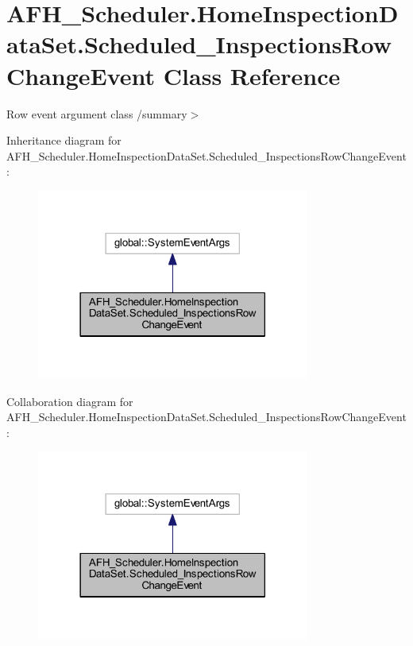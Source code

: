 \section{A\+F\+H\+\_\+\+Scheduler.\+Home\+Inspection\+Data\+Set.\+Scheduled\+\_\+\+Inspections\+Row\+Change\+Event Class Reference}
\label{class_a_f_h___scheduler_1_1_home_inspection_data_set_1_1_scheduled___inspections_row_change_event}


Row event argument class /summary$>$  




Inheritance diagram for A\+F\+H\+\_\+\+Scheduler.\+Home\+Inspection\+Data\+Set.\+Scheduled\+\_\+\+Inspections\+Row\+Change\+Event\+:
\nopagebreak
\begin{figure}[H]
\begin{center}
\leavevmode
\includegraphics[width=254pt]{class_a_f_h___scheduler_1_1_home_inspection_data_set_1_1_scheduled___inspections_row_change_event__inherit__graph}
\end{center}
\end{figure}


Collaboration diagram for A\+F\+H\+\_\+\+Scheduler.\+Home\+Inspection\+Data\+Set.\+Scheduled\+\_\+\+Inspections\+Row\+Change\+Event\+:
\nopagebreak
\begin{figure}[H]
\begin{center}
\leavevmode
\includegraphics[width=254pt]{class_a_f_h___scheduler_1_1_home_inspection_data_set_1_1_scheduled___inspections_row_change_event__coll__graph}
\end{center}
\end{figure}
